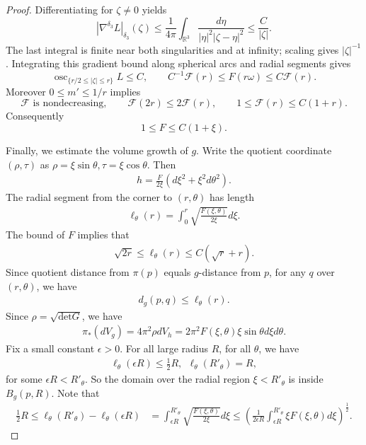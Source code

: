 \documentclass[letterpaper]{amsart}
\theoremstyle{definition}
\theoremstyle{remark}
\begin{document}
\begin{proof}
Differentiating for $\zeta\ne0$ yields
\[
 |\nabla^{\delta_3}L|_{\delta_3}(\zeta)
 \le\frac1{4\pi}\int_{\mathbb R^3}
       \frac{d\eta}{|\eta|^2|\zeta-\eta|^2}
 \le\frac C{|\zeta|}.
\]
The last integral is finite near both singularities and at infinity; scaling gives $|\zeta|^{-1}$. Integrating this gradient bound along spherical arcs and radial segments gives
\[
 \operatorname{osc}_{\{r/2\le|\zeta|\le r\}}L\le C,
 \qquad C^{-1}\mathcal F(r)\le F(r\omega)\le C\mathcal F(r).
\]
Moreover $0\le m'\le1/r$ implies
\[
 \mathcal F\text{ is nondecreasing},\qquad
 \mathcal F(2r)\le2\mathcal F(r),\qquad
 1\le\mathcal F(r)\le C(1+r).
\]
Consequently
\[
 1\le F\le C(1+\xi).
\]

Finally, we estimate the volume growth of $g$. Write the quotient coordinate $(\rho ,\tau )$ as $\rho = \xi \sin \theta , \tau = \xi \cos \theta $. Then
\begin{align*}
	h= \frac{F}{2 \xi }(d \xi ^2+ \xi ^2 d \theta ^2).
\end{align*} 
The radial segment from the corner to $(r, \theta )$ has length
\begin{align*}
	\ell_{\theta }(r) = \int_{0} ^{r} \sqrt{ \frac{F(\xi , \theta )}{2 \xi } }d \xi .
\end{align*} 
The bound of $F$ implies that
\begin{align*}
	\sqrt{2 r}  \leq \ell_{\theta }(r) \leq C (\sqrt{r} + r).
\end{align*} 
Since quotient distance from $\pi (p)$ equals $g$-distance from $p$, for any $q$ over $(r, \theta )$, we have
\begin{align*}
	d_{g}(p, q) \leq \ell_{\theta }(r).
\end{align*} 
Since $\rho = \sqrt{\mathrm{det}G} $, we have
\begin{align*}
	\pi _{*}(d V_g) = 4 \pi ^2 \rho d V_h = 2 \pi ^2 F(\xi , \theta ) \xi \sin \theta d \xi d \theta .
\end{align*} 
Fix a small constant $\epsilon >0$. For all large radius $R$, for all $\theta $, we have
\begin{align*}
	\ell_{\theta }(\epsilon R) \leq \frac{1}{2}R, \ \ \ell_{\theta }(R'_{\theta }) = R,
\end{align*} 
for some $\epsilon R< R'_{\theta }$. So the domain over the radial region $\xi < R'_{\theta }$ is inside $B_g(p, R)$. Note that
\begin{align*}
	\frac{1}{2}R \leq \ell_{\theta }(R'_{\theta }) - \ell_{\theta }(\epsilon R) &= \int_{\epsilon R}^{R'_{\theta }} \sqrt{\frac{F(\xi ,\theta )}{2 \xi }} d \xi \leq \left( \frac{1}{2 \epsilon R} \int_{\epsilon R}^{R'_{\theta }} \xi F(\xi ,\theta ) d \xi \right) ^{\frac{1}{2}}.

\end{align*}
\end{proof}
\end{document}
